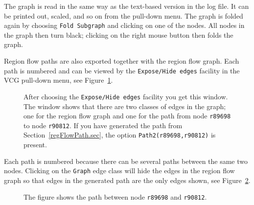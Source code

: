 \documentclass[12pt]{book}
\begin{document}
The graph is read in the same way as the text-based version in the log
file. It can be printed out, scaled, and so on from the pull-down
menu. The graph is folded again by choosing {\tt Fold Subgraph} and
clicking on one of the nodes. All nodes in the graph then turn black;
clicking on the right mouse button then folds the graph.

Region flow paths are also exported together with the region flow
graph. Each path is numbered and can be viewed by the {\tt Expose/Hide
  edges} facility in the VCG pull-down menu, see Figure~\ref{vcg3.fig}.
\begin{figure}
\begin{center}
\end{center}
\caption{After choosing the
  {\tt Expose/Hide edges} facility you get this window. The window
  shows that there are two classes of edges in the graph; one for the
  region flow graph and one for the path from node \texttt{r89698} to node
  \texttt{r90812}. If you have generated the path from Section~\ref{regFlowPath.sec}, the option
  \texttt{Path2(r89698,r90812)} is present.}
\label{vcg3.fig}
\end{figure}

Each path is numbered because there can be several paths between the same
two nodes. Clicking on the {\tt Graph} edge class will hide the edges in the
region flow graph so that edges in the generated path are the only edges
shown, see Figure~\ref{vcg4.fig}.
\begin{figure}
\begin{center}
\end{center}
\caption{The figure shows the path between
  node \texttt{r89698} and \texttt{r90812}.}
\label{vcg4.fig}
\end{figure}
\end{document}
